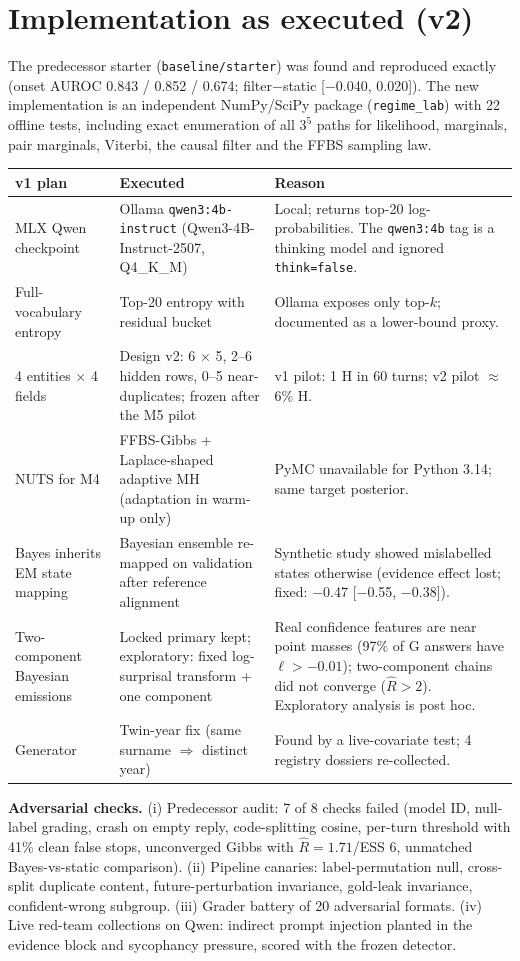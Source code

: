 \documentclass[11pt,letterpaper]{article}
\newcommand{\sectionpage}[1]{\clearpage\section{#1}}
\begin{document}
\sectionpage{Implementation as executed (v2)}
\label{sec:executed}
The predecessor starter (\texttt{baseline/starter}) was found and reproduced exactly (onset AUROC 0.843 / 0.852 / 0.674; filter$-$static [$-$0.040, 0.020]). The new implementation is an independent NumPy/SciPy package (\texttt{regime\_lab}) with 22 offline tests, including exact enumeration of all $3^5$ paths for likelihood, marginals, pair marginals, Viterbi, the causal filter and the FFBS sampling law.

\begin{tabularx}{\linewidth}{p{.27\linewidth}p{.27\linewidth}X}
\toprule v1 plan & Executed & Reason \\ \midrule
MLX Qwen checkpoint & Ollama \texttt{qwen3:4b-instruct} (Qwen3-4B-Instruct-2507, Q4\_K\_M) & Local; returns top-20 log-probabilities. The \texttt{qwen3:4b} tag is a thinking model and ignored \texttt{think=false}. \\
Full-vocabulary entropy & Top-20 entropy with residual bucket & Ollama exposes only top-$k$; documented as a lower-bound proxy. \\
4 entities $\times$ 4 fields & Design v2: 6 $\times$ 5, 2--6 hidden rows, 0--5 near-duplicates; frozen after the M5 pilot & v1 pilot: 1 H in 60 turns; v2 pilot $\approx$6\% H. \\
NUTS for M4 & FFBS-Gibbs + Laplace-shaped adaptive MH (adaptation in warm-up only) & PyMC unavailable for Python 3.14; same target posterior. \\
Bayes inherits EM state mapping & Bayesian ensemble re-mapped on validation after reference alignment & Synthetic study showed mislabelled states otherwise (evidence effect lost; fixed: $-$0.47 [$-$0.55, $-$0.38]). \\
Two-component Bayesian emissions & Locked primary kept; exploratory: fixed log-surprisal transform + one component & Real confidence features are near point masses (97\% of G answers have $\ell>-0.01$); two-component chains did not converge ($\widehat R>2$). Exploratory analysis is post hoc. \\
Generator & Twin-year fix (same surname $\Rightarrow$ distinct year) & Found by a live-covariate test; 4 registry dossiers re-collected. \\ \bottomrule
\end{tabularx}

\textbf{Adversarial checks.} (i) Predecessor audit: 7 of 8 checks failed (model ID, null-label grading, crash on empty reply, code-splitting cosine, per-turn threshold with 41\% clean false stops, unconverged Gibbs with $\widehat R=1.71$/ESS 6, unmatched Bayes-vs-static comparison). (ii) Pipeline canaries: label-permutation null, cross-split duplicate content, future-perturbation invariance, gold-leak invariance, confident-wrong subgroup. (iii) Grader battery of 20 adversarial formats. (iv) Live red-team collections on Qwen: indirect prompt injection planted in the evidence block and sycophancy pressure, scored with the frozen detector.
\end{document}
